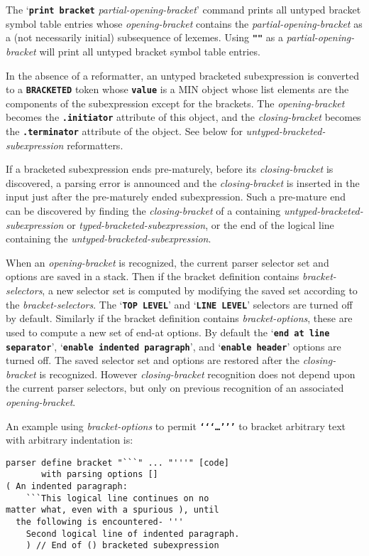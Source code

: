 \documentclass[12pt]{article}
\newcommand{\TT}[1]{{\tt \bfseries #1}}
\newenvironment{indpar}[1][0.3in]%
	{\begin{list}{}%
		     {\setlength{\itemsep}{0in}%
		      \setlength{\topsep}{0in}%
		      \setlength{\parsep}{1ex}%
		      \setlength{\labelwidth}{#1}%
		      \setlength{\leftmargin}{#1}%
		      \addtolength{\leftmargin}{\labelsep}}%
	 \item}%
	{\end{list}}
\begin{document}
The `\TT{print bracket} {\em partial-opening-bracket}' command
prints all untyped bracket symbol table entries whose
{\em opening-bracket} contains the {\em partial-opening-bracket}
as a (not necessarily initial) subsequence of lexemes.  Using \TT{""} as
a {\em partial-opening-bracket} will print all untyped bracket
symbol table entries.

In the absence of a reformatter,
an untyped bracketed subexpression is converted to a \TT{BRACKETED}
token whose \TT{value} is a
MIN object whose list elements are the components of the
subexpression except for the brackets.  The
{\em opening-bracket} becomes the \TT{.initiator}
attribute of this object, and the {\em closing-bracket}
becomes the \TT{.terminator} attribute of the object.
See below for {\em untyped-bracketed-subexpression} reformatters.

If a bracketed subexpression ends pre-maturely, before
its {\em closing-bracket} is discovered, a parsing error is
announced and the {\em closing-bracket} is inserted in the input
just after the pre-maturely ended subexpression.  Such a pre-mature end can be
discovered by finding the {\em closing-bracket} of a containing
{\em untyped-bracketed-subexpression} or {\em typed-bracketed-subexpression},
or the end of the logical line
containing the {\em untyped-bracketed-subexpression}.

When an {\em opening-bracket} is recognized, the current parser
selector set and options are saved in a stack.  Then if the
bracket definition contains {\em bracket-selectors},
a new selector set is computed by modifying the saved set
according to the {\em bracket-selectors}.
The `\TT{TOP LEVEL}' and `\TT{LINE LEVEL}' selectors are turned off
by default.
Similarly if the bracket definition contains {\em bracket-options},
these are used to compute a new set of end-at options.
By default the `\TT{end at line separator}',
`\TT{enable indented paragraph}', and `\TT{enable header}' options
are turned off.
The saved selector set and options are restored after the {\em closing-bracket}
is recognized.  However {\em closing-bracket}
recognition does not depend
upon the current parser selectors, but only on previous recognition
of an associated {\em opening-bracket}.

An example using {\em bracket-options} to permit
\TT{`{}`{}`\ldots'{}'{}'}
to bracket arbitrary text with arbitrary indentation is:
\begin{indpar}\begin{verbatim}
parser define bracket "```" ... "'''" [code]
       with parsing options []
( An indented paragraph:
    ```This logical line continues on no
matter what, even with a spurious ), until
  the following is encountered- '''
    Second logical line of indented paragraph.
    ) // End of () bracketed subexpression
\end{verbatim}\end{indpar}
\end{document}
